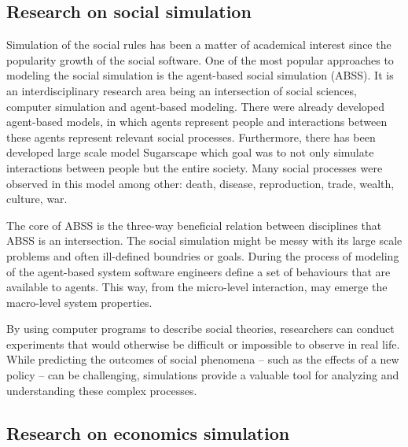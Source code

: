 \documentclass[english]{projectreport}
\begin{document}
\subsection{Research on social simulation}
\label{sec:citations}

Simulation of the social rules has been a matter of academical interest since the popularity growth of the social software\cite{li_agent-based_2008}. One of the most popular approaches to modeling the social simulation is the agent-based social simulation (ABSS). It is an interdisciplinary research area being an intersection of social sciences, computer simulation and agent-based modeling\cite{davidsson_multi_2001}. There were already developed agent-based models, in which agents represent people and interactions between these agents represent relevant social processes. Furthermore, there has been developed large scale model Sugarscape which goal was to not only simulate interactions between people but the entire society. Many social processes were observed in this model among other: death, disease, reproduction, trade, wealth, culture, war\cite{li_agent-based_2008}.

The core of ABSS is the three-way beneficial relation between disciplines that ABSS is an intersection. The social simulation might be messy with its large scale problems and often ill-defined boundries or goals. During the process of modeling of the agent-based system software engineers define a set of behaviours that are available to agents. This way, from the micro-level interaction, may emerge the macro-level system properties. 

By using computer programs to describe social theories, researchers can conduct experiments that would otherwise be difficult or impossible to observe in real life. While predicting the outcomes of social phenomena – such as the effects of a new policy – can be challenging, simulations provide a valuable tool for analyzing and understanding these complex processes\cite{davidsson_multi_2001}.





\subsection{Research on economics simulation}
\label{sec:research-economics}
\end{document}
